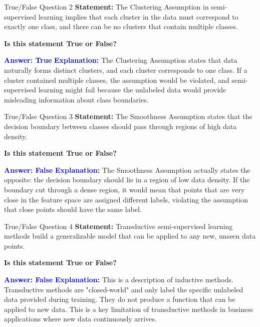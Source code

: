 \documentclass{beamer}
\begin{document}
	\begin{frame}{True/False Question 2}
		\textbf{Statement:} The Clustering Assumption in semi-supervised learning implies that each cluster in the data must correspond to exactly one class, and there can be no clusters that contain multiple classes.
		
		\vspace{0.3cm}
		\textbf{Is this statement True or False?}
		
		\vspace{0.2cm}
		\textcolor{blue}{\textbf{Answer: True}}
		\vspace{0.2cm}
		\textcolor{blue}{\textbf{Explanation:}} The Clustering Assumption states that data naturally forms distinct clusters, and each cluster corresponds to one class. If a cluster contained multiple classes, the assumption would be violated, and semi-supervised learning might fail because the unlabeled data would provide misleading information about class boundaries.
	\end{frame}
	
	\begin{frame}{True/False Question 3}
		\textbf{Statement:} The Smoothness Assumption states that the decision boundary between classes should pass through regions of high data density.
		
		\vspace{0.3cm}
		\textbf{Is this statement True or False?}
		
		\vspace{0.2cm}
		\textcolor{blue}{\textbf{Answer: False}}
		\vspace{0.2cm}
		\textcolor{blue}{\textbf{Explanation:}} The Smoothness Assumption actually states the opposite: the decision boundary should lie in a region of low data density. If the boundary cut through a dense region, it would mean that points that are very close in the feature space are assigned different labels, violating the assumption that close points should have the same label.
	\end{frame}
	
	\begin{frame}{True/False Question 4}
		\textbf{Statement:} Transductive semi-supervised learning methods build a generalizable model that can be applied to any new, unseen data points.
		
		\vspace{0.3cm}
		\textbf{Is this statement True or False?}
		
		\vspace{0.2cm}
		\textcolor{blue}{\textbf{Answer: False}}
		\vspace{0.2cm}
		\textcolor{blue}{\textbf{Explanation:}} This is a description of inductive methods. Transductive methods are "closed-world" and only label the specific unlabeled data provided during training. They do not produce a function that can be applied to new data. This is a key limitation of transductive methods in business applications where new data continuously arrives.
	\end{frame}
	
\end{document}
